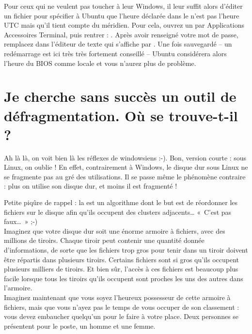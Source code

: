 \begin{nota}
Pour ceux qui ne veulent pas toucher à leur Windows, il leur suffit alors d'éditer un fichier pour spécifier à Ubuntu que l'heure déclarée dans le  n'est pas l'heure UTC mais qu'il tient compte du méridien. Pour cela, ouvrez un  par Applications \FlecheDroite Accessoires \FlecheDroite Terminal, puis rentrer : . Après avoir renseigné votre mot de passe, remplacez dans l'éditeur de texte qui s'affiche  par . Une fois sauvegardé -- un redémarrage est ici très très fortement conseillé -- Ubuntu considérera alors l'heure du BIOS comme locale et vous n'aurez plus de problème.
\end{nota}
\section{Je cherche sans succès un outil de défragmentation. Où se trouve-t-il ?}
Ah là là, on voit bien là les réflexes de windowsiens :-). Bon, version courte :  sous Linux, on oublie ! En effet, contrairement à Windows, le disque dur sous Linux ne se fragmente pas au gré des utilisations. Il se passe même le phénomène contraire : plus on utilise son disque dur, et moins il est fragmenté !\par
Petite piqûre de rappel : la  est un algorithme dont le but est de réordonner les fichiers sur le disque afin qu'ils occupent des clusters adjacents\ldots{} «~C'est pas faux\ldots{}~» ;-)\\
Imaginez que votre disque dur soit une énorme armoire à fichiers, avec des millions de tiroirs. Chaque tiroir peut contenir une quantité donnée d'informations, de sorte que les fichiers trop gros pour tenir dans un tiroir doivent être répartis dans plusieurs tiroirs. Certains fichiers sont si gros qu'ils occupent plusieurs milliers de tiroirs. Et bien sûr, l'accès à ces fichiers est beaucoup plus facile lorsque tous les tiroirs qu'ils occupent sont proches les uns des autres dans l'armoire.\\
Imaginez maintenant que vous soyez l'heureux possesseur de cette armoire à fichiers, mais que vous n'ayez pas le temps de vous occuper de son classement : vous devez embaucher quelqu'un pour le faire à votre place. Deux personnes se présentent pour le poste, un homme et une femme.\par
